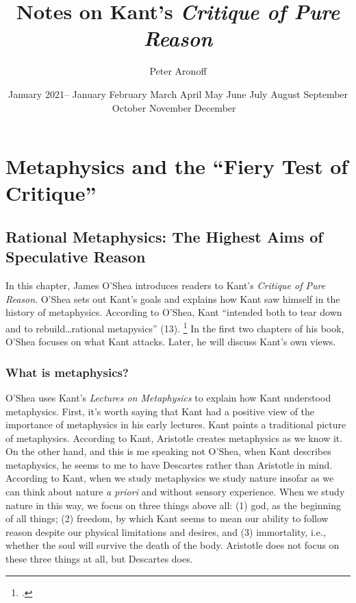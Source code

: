 \documentclass[12pt,letterpaper]{article}
\newcommand{\MONTH}{%
  \ifcase\the\month
  \or January%
  \or February%
  \or March%
  \or April%
  \or May%
  \or June%
  \or July%
  \or August%
  \or September%
  \or October%
  \or November%
  \or December%
  \fi}
\begin{document}
\begin{titlepage}
\title{Notes on Kant's \textit{Critique of Pure Reason}}
\author{Peter Aronoff}
\date{January 2021--\MONTH\ \the\year}
\maketitle
\thispagestyle{empty}
\end{titlepage}

\pagestyle{notes}

\section*{Metaphysics and the ``Fiery Test of Critique''}



\subsection*{Rational Metaphysics: The Highest Aims of Speculative Reason}

In this chapter, James O'Shea introduces readers to Kant's \textit{Critique of Pure Reason}.
O'Shea sets out Kant's goals and explains how Kant saw himself in the history of metaphysics.
According to O'Shea, Kant ``intended both to tear down and to rebuild\ldots rational metapysics'' (13).%
\footcite[Unless I say otherwise, all references to O'Shea come from][]{kants-critique-pure-reason-oshea-2014}
In the first two chapters of his book, O'Shea focuses on what Kant attacks.
Later, he will discuss Kant's own views.

\subsubsection*{What is metaphysics?}

O'Shea uses Kant's \textit{Lectures on Metaphysics} to explain how Kant understood metaphysics.
First, it's worth saying that Kant had a positive view of the importance of metaphysics in his early lectures.
Kant paints a traditional picture of metaphysics.
According to Kant, Aristotle creates metaphysics as we know it.
On the other hand, and this is me speaking not O'Shea, when Kant describes metaphysics, he seems to me to have Descartes rather than Aristotle in mind.
According to Kant, when we study metaphysics we study nature insofar as we can think about nature \textit{a priori} and without sensory experience.
When we study nature in this way, we focus on three things above all: (1) god, as the beginning of all things; (2) freedom, by which Kant seems to mean our ability to follow reason despite our physical limitations and desires, and (3) immortality, i.e., whether the soul will survive the death of the body.
Aristotle does not focus on these three things at all, but Descartes does.
\end{document}
